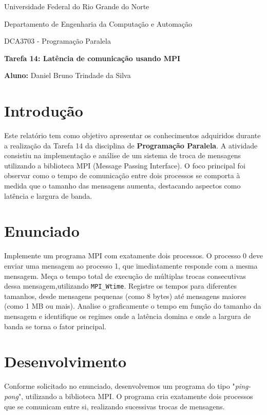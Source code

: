 \documentclass[a4paper, 12pt]{article}
\begin{document}
	
	\begin{center}
		Universidade Federal do Rio Grande do Norte
		
		Departamento de Engenharia da Computação e Automação  
		
		DCA3703 - Programação Paralela  
		
		\textbf{Tarefa 14: Latência de comunicação usando MPI}  
		
		\textbf{Aluno:} Daniel Bruno Trindade da Silva  
	\end{center}  
	
	\section{Introdução}
	
	\hspace{0.62cm}Este relatório tem como objetivo apresentar os conhecimentos adquiridos durante a realização da Tarefa 14 da disciplina de \textbf{Programação Paralela}. A atividade consistiu na implementação e análise de um sistema de troca de mensagens utilizando a biblioteca MPI (Message Passing Interface). O foco principal foi observar como o tempo de comunicação entre dois processos se comporta à medida que o tamanho das mensagens aumenta, destacando aspectos como latência e largura de banda.
	
	\section{Enunciado}
	
	\hspace{0.62cm}Implemente um programa MPI com exatamente dois processos. O processo 0 deve enviar uma mensagem ao processo 1, que imediatamente responde com a mesma mensagem. Meça o tempo total de execução de múltiplas trocas consecutivas dessa mensagem,utilizando \texttt{MPI\_Wtime}. Registre os tempos para diferentes tamanhos, desde mensagens pequenas (como 8 bytes) até mensagens maiores (como 1 MB ou mais). Analise o graficamente o tempo em função do tamanho da mensagem e identifique os regimes onde a latência domina e onde a largura de banda se torna o fator principal.
	
	\section{Desenvolvimento}
	
	\hspace{0.62cm}Conforme solicitado no enunciado, desenvolvemos um programa do tipo "\textit{ping-pong}", utilizando a biblioteca MPI. O programa cria exatamente dois processos que se comunicam entre si, realizando sucessivas trocas de mensagens.
	
\end{document}
